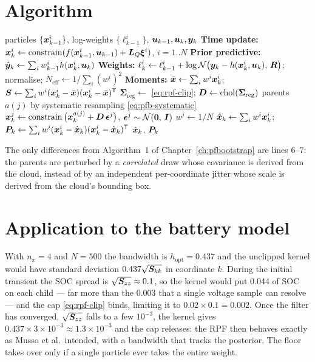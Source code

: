 \section{Algorithm}
\begin{algorithm}[H]
\caption{PF-Regularized --- one sampling period}
\begin{algorithmic}[1]
\Require particles $\{\bm{x}_{k-1}^i\}$, log-weights $\{\ell^i_{k-1}\}$, $\bm{u}_{k-1},\bm{u}_k,\bm{y}_k$
\State \textbf{Time update:} $\bm{x}_k^i \gets \operatorname{constrain}(f(\bm{x}_{k-1}^i,\bm{u}_{k-1}) + \bm{L}_Q\bm\xi^i)$, $i=1..N$
\State \textbf{Prior predictive:} $\hat{\bm{y}}_k \gets \sum_i w^i_{k-1} h(\bm{x}_k^i,\bm{u}_k)$
\State \textbf{Weights:} $\ell^i_k \gets \ell^i_{k-1} + \log \mathcal{N}\!\left(\bm{y}_k - h(\bm{x}_k^i,\bm{u}_k),\,\bm{R}\right)$; normalise; $N_{\mathrm{eff}} \gets 1/\sum_i (w^i)^2$
\State \textbf{Moments:} $\bar{\bm{x}} \gets \sum_i w^i\bm{x}_k^i$; \; $\bm{S} \gets \sum_i w^i(\bm{x}_k^i - \bar{\bm{x}})(\bm{x}_k^i-\bar{\bm{x}})^{\mathsf{T}}$
 
  \State $\bm{\Sigma}_{\mathrm{reg}} \gets$ \eqref{eq:rpf-clip}; \quad $\bm{D} \gets \operatorname{chol}(\bm{\Sigma}_{\mathrm{reg}})$
  \State parents $a(j)$ by systematic resampling \eqref{eq:pfb-systematic}
    \State $\bm{x}_k^j \gets \operatorname{constrain}\big(\bm{x}_k^{a(j)} + \bm{D}\,\bm{\epsilon}^j\big)$, \; $\bm\epsilon^j \sim \mathcal{N}\!\left(\bm 0,\,\bm{I}\right)$
    \State $w^j \gets 1/N$
  \EndFor
\EndIf
\State $\hat{\bm{x}}_k \gets \sum_i w^i \bm{x}^i_k$; \; $\bm{P}_k \gets \sum_i w^i (\bm{x}^i_k - \hat{\bm{x}}_k)(\bm{x}^i_k-\hat{\bm{x}}_k)^{\mathsf{T}}$
\Ensure $\hat{\bm{x}}_k$, $\bm{P}_k$
\end{algorithmic}
\end{algorithm}

\noindent The only differences from Algorithm~1 of Chapter~\ref{ch:pfbootstrap} are lines 6--7:
the parents are perturbed by a \emph{correlated} draw whose covariance is derived from the cloud,
instead of by an independent per-coordinate jitter whose scale is derived from the cloud's bounding
box.

\section{Application to the battery model}
With $n_x = 4$ and $N = 500$ the bandwidth is $h_{\mathrm{opt}} = 0.437$ and the unclipped kernel
would have standard deviation $0.437\sqrt{\bm{S}_{kk}}$ in coordinate $k$.  During the initial
transient the SOC spread is $\sqrt{\bm{S}_{zz}}\approx 0.1$, so the kernel would put
\num{0.044} of SOC on each child --- far more than the \num{0.003} that a single voltage sample can
resolve --- and the cap \eqref{eq:rpf-clip} binds, limiting it to $0.02\times0.1 = \num{0.002}$.
Once the filter has converged, $\sqrt{\bm{S}_{zz}}$ falls to a few $10^{-3}$, the kernel gives
$0.437\times 3\times10^{-3} \approx 1.3\times10^{-3}$ and the cap releases: the RPF then behaves
exactly as Musso et al.\ intended, with a bandwidth that tracks the posterior.  The floor takes
over only if a single particle ever takes the entire weight.


